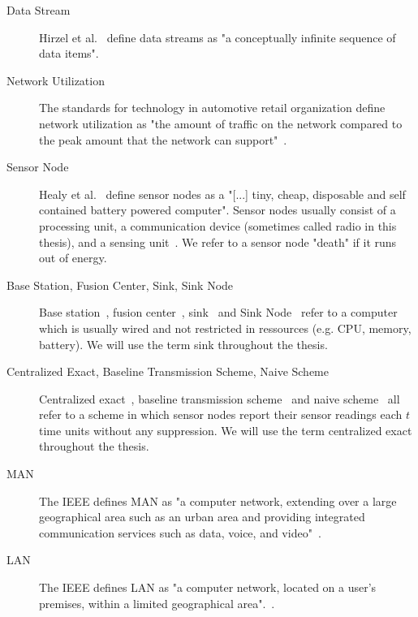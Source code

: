 \begin{description}

    \item[Data Stream]
        Hirzel et al.~\cite{hirzel2014catalog} define data streams as "a
        conceptually infinite sequence of data items".

    \item[Network Utilization]
        The standards for technology in automotive retail organization define
        network utilization as "the amount of traffic on the network compared
        to the peak amount that the network can support"~\cite{networkutil}.

    \item[Sensor Node]
        Healy et al.~\cite{healy2008wireless} define sensor nodes as a "[...]
        tiny, cheap, disposable and self contained battery powered computer".
        Sensor nodes usually consist of a processing unit, a communication
        device (sometimes called radio in this thesis), and a sensing
        unit~\cite{akyildiz2002wireless}. We refer to a sensor node "death" if
        it runs out of energy.

    \item[Base Station, Fusion Center, Sink, Sink Node]
        Base station~\cite{padhy2006utility}, fusion
        center~\cite{willett2004backcasting}, sink~\cite{alippi2009energy} and
        Sink Node~\cite{chen2013sink} refer to a computer which is usually
        wired and not restricted in ressources (e.g. CPU, memory, battery).
        We will use the term sink throughout the thesis.

    \item[Centralized Exact, Baseline Transmission Scheme, Naive Scheme]
        Centralized exact~\cite{gedik2007asap}, baseline transmission
        scheme~\cite{luo2009compressive} and naive
        scheme~\cite{cheng2010efficient} all refer to a scheme in which sensor
        nodes report their sensor readings each $ t $ time units without any
        suppression. We will use the term centralized exact throughout the
        thesis.

    \item[\ac{MAN}]
        The \ac{IEEE} defines \ac{MAN} as "a computer network, extending over a
        large geographical area such as an urban area and providing integrated
        communication services such as data, voice, and video"~\cite{ieee802}.

    \item[\ac{LAN}]
        The \ac{IEEE} defines \ac{LAN} as "a computer network, located on a
        user’s premises, within a limited geographical area".~\cite{ieee802}.


\end{description}
